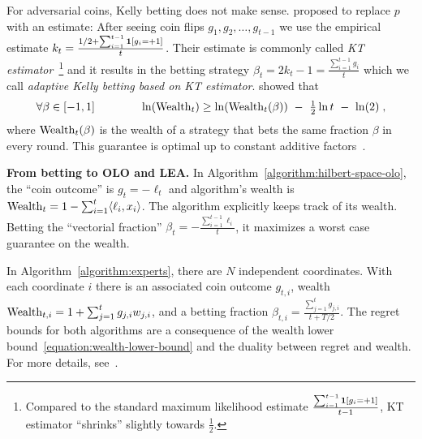 For adversarial coins, Kelly betting does not make sense.
\citet{Krichevsky-Trofimov-1981} proposed to replace $p$ with an estimate:
After seeing coin flips
$g_1, g_2, \dots, g_{t-1}$ we use the empirical estimate $k_t = \frac{1/2 +
\sum_{i=1}^{t-1} \mathbf{1}[g_i = +1]}{t}$. Their
estimate is commonly called \emph{KT estimator}~\footnote{Compared to the
standard maximum likelihood estimate $\frac{\sum_{i=1}^{t-1} \mathbf{1}[g_i =
+1]}{t-1}$, KT estimator ``shrinks'' slightly towards $\frac{1}{2}$.}
and it results in the betting strategy
$
\beta_t = 2k_t - 1 = \tfrac{\sum_{i=1}^{t-1} g_i}{t}
$
which we call \emph{adaptive Kelly betting based on KT estimator}.
\citeauthor{Krichevsky-Trofimov-1981} showed that
\begin{equation}
\label{equation:wealth-lower-bound}
\forall \beta \in [-1,1] \qquad \qquad \ln(\operatorname{Wealth}_t) \ge \ln(\operatorname{Wealth}_t(\beta)) \ - \ \tfrac{1}{2} \ln t \ - \ \ln(2) \; ,
\end{equation}
where $\operatorname{Wealth}_t(\beta)$ is the wealth of a strategy that bets the same
fraction $\beta$ in every round. This guarantee is optimal up to constant
additive factors~\citep{Cesa-Bianchi-Lugosi-2006}.

\textbf{From betting to \ac{OLO} and \ac{LEA}.}
In Algorithm~\ref{algorithm:hilbert-space-olo}, the ``coin outcome'' is
$g_t = -\ell_t$ and algorithm's wealth is
$
\operatorname{Wealth}_t = 1 - \sum_{i=1}^t \langle \ell_i, x_i \rangle
$.
The algorithm explicitly keeps track of its wealth. Betting the ``vectorial fraction''
$\beta_t = - \tfrac{\sum_{i=1}^{t-1} \ell_i}{t}$, it maximizes a worst case guarantee on the wealth.

In Algorithm~\ref{algorithm:experts}, there are $N$ independent coordinates.
With each coordinate $i$ there is an associated coin outcome $g_{t,i}$, wealth
$\operatorname{Wealth}_{t,i} = 1 + \sum_{j=1}^t g_{j,i} w_{j,i}$, and a betting fraction
$\beta_{t,i} = \tfrac{\sum_{j=1}^t g_{j,i}}{t + T/2}$.
The regret bounds for both algorithms are a consequence of the wealth lower
bound~\eqref{equation:wealth-lower-bound} and the duality between regret and wealth.  For more details, see~\cite{Orabona-Pal-2016-parameter-free}.
